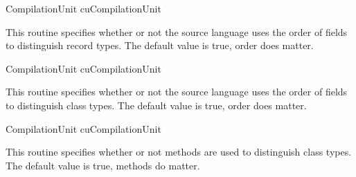 	{CompilationUnit cu}{CompilationUnit}
\begin{functionality}
This routine specifies whether or not the source language uses the
order of fields to distinguish record types.  The default value is
true, order does matter.
\end{functionality}

	{CompilationUnit cu}{CompilationUnit}
\begin{functionality}
This routine specifies whether or not the source language uses the
order of fields to distinguish class types.  The default value is
true, order does matter.
\end{functionality}

	{CompilationUnit cu}{CompilationUnit}
\begin{functionality}
This routine specifies whether or not methods are used to distinguish
class types.  The default value is true, methods do matter.
\end{functionality}






